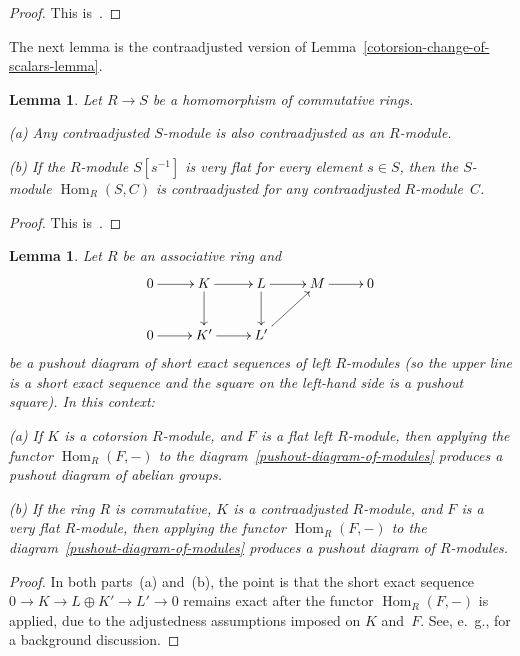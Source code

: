 \documentclass[12pt,a4paper]{amsart}
\newcommand{\+}{\nobreakdash-}
\renewcommand{\:}{\colon}
\newcommand{\rarrow}{\longrightarrow}
\DeclareMathOperator{\Hom}{Hom}
\theoremstyle{plain}
\newtheorem{lem}[thm]{Lemma}
\theoremstyle{definition}
\begin{document}
\begin{proof}
 This is~\cite[Lemmas~1.2.3(b) and~1.2.2(b)]{Pcosh}.
\end{proof}

 The next lemma is the contraadjusted version of
Lemma~\ref{cotorsion-change-of-scalars-lemma}.

\begin{lem} \label{contraadjusted-change-of-scalars-lemma}
 Let $R\rarrow S$ be a homomorphism of commutative rings. \par
\textup{(a)} Any contraadjusted $S$\+module is also contraadjusted
as an $R$\+module. \par
\textup{(b)} If the $R$\+module $S[s^{-1}]$ is very flat for every
element $s\in S$, then the $S$\+module\/ $\Hom_R(S,C)$ is
contraadjusted for any contraadjusted $R$\+module~$C$.
\end{lem}

\begin{proof}
 This is~\cite[Lemmas~1.2.2(a) and~1.2.3(a)]{Pcosh}.
\end{proof}

\begin{lem} \label{Hom-into-pushout-lemma}
 Let $R$ be an associative ring and
\begin{equation} \label{pushout-diagram-of-modules}
\begin{gathered}
 \xymatrix{
  0 \ar[r] & K \ar[r] \ar[d] & L \ar[r] \ar[d] & M \ar[r] & 0 \\
  0 \ar[r] & K' \ar[r] & L' \ar[ur]
 }
\end{gathered}
\end{equation}
be a pushout diagram of short exact sequences of left $R$\+modules
(so the upper line is a short exact sequence and the square on
the left-hand side is a pushout square).
 In this context: \par
\textup{(a)} If $K$ is a cotorsion $R$\+module, and $F$ is a flat
left $R$\+module, then applying the functor\/ $\Hom_R(F,{-})$ to
the diagram~\eqref{pushout-diagram-of-modules} produces
a pushout diagram of abelian groups. \par
\textup{(b)} If the ring $R$ is commutative, $K$ is a contraadjusted
$R$\+module, and $F$ is a very flat $R$\+module, then applying
the functor\/ $\Hom_R(F,{-})$ to
the diagram~\eqref{pushout-diagram-of-modules} produces
a pushout diagram of $R$\+modules.
\end{lem}

\begin{proof}
 In both parts~(a) and~(b), the point is that the short exact
sequence $0\rarrow K\rarrow L\oplus K'\rarrow L'\rarrow0$ remains
exact after the functor $\Hom_R(F,{-})$ is applied, due to
the adjustedness assumptions imposed on $K$ and~$F$.
 See, e.~g., \cite[Proposition~2.12]{Bueh} for a background
discussion.
\end{proof}
\end{document}
